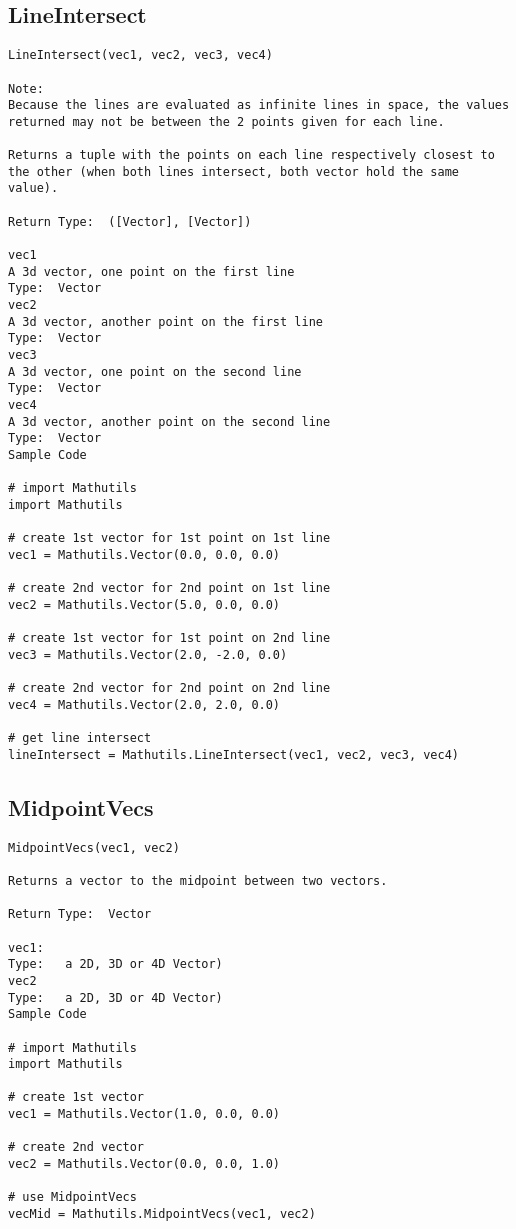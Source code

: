 \subsection{LineIntersect}
\begin{verbatim}
LineIntersect(vec1, vec2, vec3, vec4)

Note:
Because the lines are evaluated as infinite lines in space, the values returned may not be between the 2 points given for each line.

Returns a tuple with the points on each line respectively closest to the other (when both lines intersect, both vector hold the same value). 

Return Type:  ([Vector], [Vector])

vec1
A 3d vector, one point on the first line
Type:  Vector
vec2 
A 3d vector, another point on the first line
Type:  Vector
vec3
A 3d vector, one point on the second line
Type:  Vector
vec4
A 3d vector, another point on the second line
Type:  Vector
Sample Code

# import Mathutils
import Mathutils

# create 1st vector for 1st point on 1st line
vec1 = Mathutils.Vector(0.0, 0.0, 0.0)

# create 2nd vector for 2nd point on 1st line
vec2 = Mathutils.Vector(5.0, 0.0, 0.0)

# create 1st vector for 1st point on 2nd line
vec3 = Mathutils.Vector(2.0, -2.0, 0.0)

# create 2nd vector for 2nd point on 2nd line
vec4 = Mathutils.Vector(2.0, 2.0, 0.0)

# get line intersect
lineIntersect = Mathutils.LineIntersect(vec1, vec2, vec3, vec4)
\end{verbatim}

\subsection{MidpointVecs}
\begin{verbatim}
MidpointVecs(vec1, vec2)

Returns a vector to the midpoint between two vectors.

Return Type:  Vector

vec1:
Type:   a 2D, 3D or 4D Vector)
vec2
Type:   a 2D, 3D or 4D Vector)
Sample Code

# import Mathutils
import Mathutils

# create 1st vector 
vec1 = Mathutils.Vector(1.0, 0.0, 0.0)

# create 2nd vector 
vec2 = Mathutils.Vector(0.0, 0.0, 1.0)

# use MidpointVecs
vecMid = Mathutils.MidpointVecs(vec1, vec2)
\end{verbatim}

